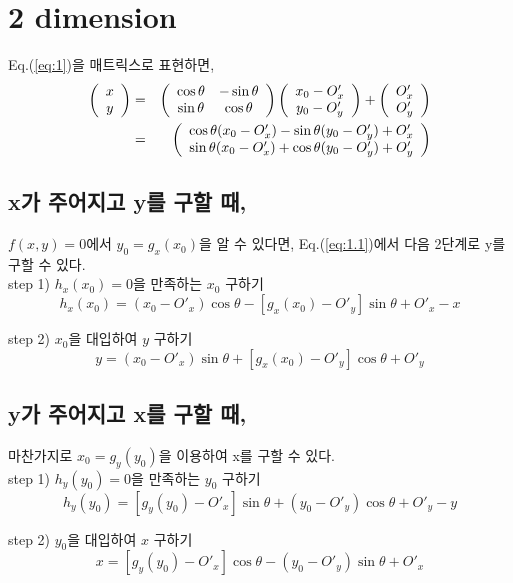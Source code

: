 \documentclass[a4paper]{article}
\begin{document}
\section{2 dimension}
Eq.(\ref{eq:1})을 매트릭스로 표현하면,
\begin{eqnarray}
	\left( \begin{array}{c}
		x \\ y
	\end{array}	\right)  
	&=& \left( \begin{array}{cc}
		\cos\theta & -\sin\theta \\
		\sin\theta & \cos\theta 
	\end{array}	\right)
	\left( \begin{array}{c}
		x_0 - O'_x \\
		y_0 - O'_y 
	\end{array}	\right) 
	+ \left( \begin{array}{c}
		O'_x \\
		O'_y 
	\end{array}	\right) \notag \\
	&=& \left( \begin{array}{c}
		\cos\theta(x_0 - O'_x) - \sin\theta(y_0 - O'_y) + O'_x \\
		\sin\theta(x_0 - O'_x) + \cos\theta(y_0 - O'_y) + O'_y 
	\end{array} \right) \label{eq:1.1}
\end{eqnarray}

\subsection{x가 주어지고 y를 구할 때,}
$f(x,y)=0$에서 $y_0=g_x(x_0)$을 알 수 있다면, Eq.(\ref{eq:1.1})에서 다음 2단계로 y를 구할 수 있다.\\

step 1) $h_x(x_0)=0$을 만족하는 $x_0$ 구하기
\begin{equation}
	h_x(x_0) = (x_0 - O'_x)\cos\theta - \left[g_x(x_0) - O'_y\right]\sin\theta + O'_x - x \label{eq:1.2}
\end{equation}

step 2) $x_0$을 대입하여 $y$ 구하기
\begin{equation}
	y = (x_0 - O'_x)\sin\theta + \left[g_x(x_0) - O'_y\right]\cos\theta + O'_y \label{eq:1.3}
\end{equation}

\subsection{y가 주어지고 x를 구할 때,}
마찬가지로 $x_0=g_y(y_0)$을 이용하여 x를 구할 수 있다.\\

step 1) $h_y(y_0)=0$을 만족하는 $y_0$ 구하기
\begin{equation}
	h_y(y_0) = \left[g_y(y_0) - O'_x\right]\sin\theta + (y_0 - O'_y)\cos\theta + O'_y - y \label{eq:1.4}
\end{equation}

step 2) $y_0$을 대입하여 $x$ 구하기
\begin{equation}
	x = \left[g_y(y_0) - O'_x\right]\cos\theta - (y_0 - O'_y)\sin\theta + O'_x \label{eq:1.5}
\end{equation}
\end{document}
